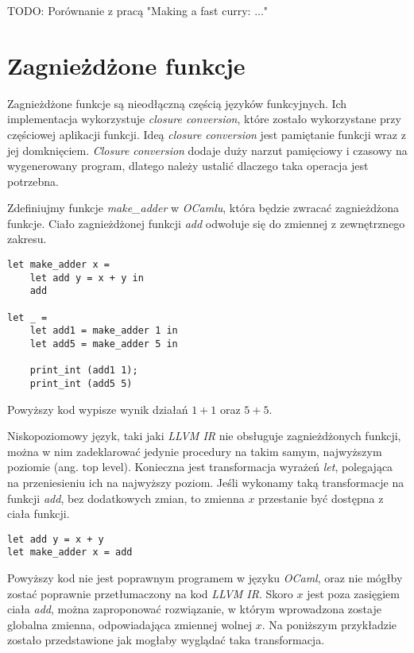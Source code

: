 \documentclass[declaration,shortabstract]{iithesis}
\begin{document}
TODO: Porównanie z pracą "Making a fast curry: ..."

\section{Zagnieżdżone funkcje}

Zagnieżdżone funkcje są nieodłączną częścią języków funkcyjnych. Ich implementacja wykorzystuje 
\textit{closure conversion}, które zostało wykorzystane przy częściowej aplikacji funkcji. 
Ideą \textit{closure conversion} jest pamiętanie funkcji wraz z jej domknięciem. 
\textit{Closure conversion} dodaje duży narzut pamięciowy i czasowy na wygenerowany program,
dlatego należy ustalić dlaczego taka operacja jest potrzebna.

Zdefiniujmy funkcje \textit{make\_adder} w \textit{OCamlu}, która będzie zwracać zagnieżdżona funkcje.
Ciało zagnieżdżonej funkcji \textit{add} odwołuje się do zmiennej z zewnętrznego zakresu.

\begin{lstlisting}[frame=single, caption={Zagnieżdżona funkcja w \textit{OCamlu}}]
let make_adder x = 
    let add y = x + y in 
    add 
  
let _ = 
    let add1 = make_adder 1 in 
    let add5 = make_adder 5 in 
    
    print_int (add1 1);
    print_int (add5 5) 
\end{lstlisting}
Powyższy kod wypisze wynik działań $1 + 1$ oraz $5 + 5$. 

Niskopoziomowy język, taki jaki \textit{LLVM IR} nie obsługuje zagnieżdżonych funkcji, można w
nim zadeklarować jedynie procedury na takim samym, najwyższym poziomie (ang. top level). 
Konieczna jest transformacja wyrażeń \textit{let}, polegająca na przeniesieniu ich na najwyższy poziom. 
Jeśli wykonamy taką transformacje na funkcji \textit{add}, bez dodatkowych zmian, to zmienna $x$
przestanie być dostępna z ciała funkcji.

\begin{lstlisting}[frame=single, caption={Po przeniesieniu funkcji \textit{add} na najwyższy poziom}]
let add y = x + y 
let make_adder x = add 
\end{lstlisting}

Powyższy kod nie jest poprawnym programem w języku \textit{OCaml}, oraz 
nie mógłby zostać poprawnie przetłumaczony na kod \textit{LLVM IR}. 
Skoro $x$ jest poza zasięgiem ciała \textit{add}, można zaproponować rozwiązanie,
w którym wprowadzona zostaje globalna zmienna, odpowiadająca zmiennej wolnej $x$. 
Na poniższym przykładzie zostało przedstawione jak mogłaby wyglądać taka transformacja.
\end{document}

